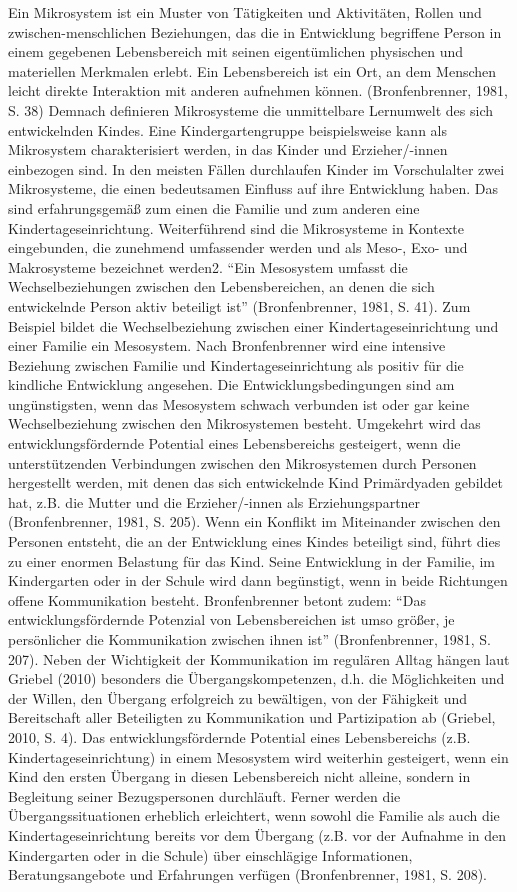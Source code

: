 \documentclass[12pt,a4paper]{article}
\begin{document}
Ein Mikrosystem ist ein Muster von Tätigkeiten und Aktivitäten, Rollen und zwischen-menschlichen Beziehungen, das die in Entwicklung begriffene Person in einem gegebenen Lebensbereich mit seinen eigentümlichen physischen und materiellen Merkmalen erlebt. Ein Lebensbereich ist ein Ort, an dem Menschen leicht direkte Interaktion mit anderen aufnehmen können.  (Bronfenbrenner, 1981, S. 38)
Demnach definieren Mikrosysteme die unmittelbare Lernumwelt des sich entwickelnden Kindes. Eine Kindergartengruppe beispielsweise kann als Mikrosystem charakterisiert werden, in das Kinder und Erzieher/-innen einbezogen sind. In den meisten Fällen durchlaufen Kinder im Vorschulalter zwei Mikrosysteme, die einen bedeutsamen Einfluss auf ihre Entwicklung haben. Das sind erfahrungsgemäß zum einen die Familie und zum anderen eine Kindertageseinrichtung. Weiterführend sind die Mikrosysteme in Kontexte eingebunden, die zunehmend umfassender werden und als Meso-, Exo- und Makrosysteme bezeichnet werden2. 
	"`Ein Mesosystem umfasst die Wechselbeziehungen zwischen den Lebensbereichen, an denen die sich entwickelnde Person aktiv beteiligt ist"' (Bronfenbrenner, 1981, S. 41). Zum Beispiel bildet die Wechselbeziehung zwischen einer Kindertageseinrichtung und einer Familie ein Mesosystem. Nach Bronfenbrenner wird eine intensive Beziehung zwischen Familie und Kindertageseinrichtung als positiv für die kindliche Entwicklung angesehen. Die Entwicklungsbedingungen sind am ungünstigsten, wenn das Mesosystem schwach verbunden ist oder gar keine Wechselbeziehung zwischen den Mikrosystemen besteht. Umgekehrt wird das entwicklungsfördernde Potential eines Lebensbereichs gesteigert, wenn die unterstützenden Verbindungen zwischen den Mikrosystemen durch Personen hergestellt werden, mit denen das sich entwickelnde Kind Primärdyaden gebildet hat, z.B. die Mutter und die Erzieher/-innen als Erziehungspartner (Bronfenbrenner, 1981, S. 205). Wenn ein Konflikt im Miteinander zwischen den Personen entsteht, die an der Entwicklung eines Kindes beteiligt sind, führt dies zu einer enormen Belastung für das Kind. Seine Entwicklung in der Familie, im Kindergarten oder in der Schule wird dann begünstigt, wenn in beide Richtungen offene Kommunikation besteht. 
Bronfenbrenner betont zudem: "`Das entwicklungsfördernde Potenzial von Lebensbereichen ist umso größer, je persönlicher die Kommunikation zwischen ihnen ist"' (Bronfenbrenner, 1981, S. 207). Neben der Wichtigkeit der Kommunikation im regulären Alltag hängen laut Griebel (2010) besonders die Übergangskompetenzen, d.h. die Möglichkeiten und der Willen, den Übergang erfolgreich zu bewältigen, von der Fähigkeit und Bereitschaft aller Beteiligten zu Kommunikation und Partizipation ab (Griebel, 2010, S. 4). Das entwicklungsfördernde Potential eines Lebensbereichs (z.B. Kindertageseinrichtung) in einem Mesosystem wird weiterhin gesteigert, wenn ein Kind den ersten Übergang in diesen Lebensbereich nicht alleine, sondern in Begleitung seiner Bezugspersonen durchläuft. Ferner werden die Übergangssituationen erheblich erleichtert, wenn sowohl die Familie als auch die Kindertageseinrichtung bereits vor dem Übergang  (z.B. vor der Aufnahme in den Kindergarten oder in die Schule) über einschlägige Informationen, Beratungsangebote und Erfahrungen verfügen (Bronfenbrenner, 1981, S. 208).
\end{document}
